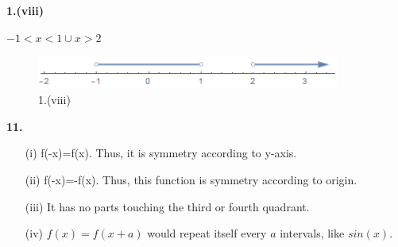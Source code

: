 \documentclass[a4paper,12pt]{report}
\begin{document}
\pagebreak
\noindent
\textbf{1.(viii)}

\noindent
$-1< x<1\cup x>2$ 

\begin{figure}[h]
  \centering
  \includegraphics[width=10cm]{Pics/Chap41(viii).png}
  \caption{1.(viii)}
\end{figure}

\noindent
\textbf{11.}

\begin{enumerate}
\item[(i)] f(-x)=f(x). Thus, it is symmetry according to y-axis.
\item[(ii)] f(-x)=-f(x). Thus, this function is symmetry according to origin.
\item[(iii)] It has no parts touching the third or fourth quadrant.
\item[(iv)] $f(x)=f(x+a)$ would repeat itself every $a$ intervals, like $sin(x)$.
\end{enumerate}
\end{document}
